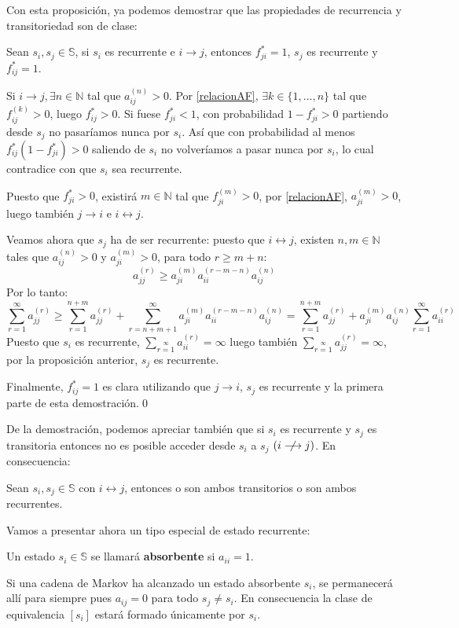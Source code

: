Con esta proposición, ya podemos demostrar que las propiedades de recurrencia y transitoriedad son de clase:
\begin{theorem}\label{relacionEstadosRecurrentes}
    Sean $s_i, s_j\in\mathbb{S}$, si $s_i$ es recurrente e $i\longrightarrow j$, entonces $f_{ji}^*=1$, $s_j$ es recurrente y $f_{ij}^*=1$.
\end{theorem}
\begin{proofs*}
Si $i\longrightarrow j, \exists n\in\mathbb{N}$ tal que $a_{ij}^{(n)}>0$. Por \ref{relacionAF}, $\exists k\in\{1,\dots ,n\}$ tal que $f_{ij}^{(k)}>0$, luego $f_{ij}^*>0$. Si fuese $f_{ji}^*<1$, con probabilidad $1-f_{ji}^*>0$ partiendo desde $s_j$ no pasaríamos nunca por $s_i$. Así que con probabilidad al menos $f_{ij}^*(1-f_{ji}^*)>0$ saliendo de $s_i$ no volveríamos a pasar nunca por $s_i$, lo cual contradice con que $s_i$ sea recurrente.

Puesto que $f_{ji}^*>0$, existirá $m\in\mathbb{N}$ tal que $f_{ji}^{(m)}>0$, por \ref{relacionAF}, $a_{ji}^{(m)}>0$, luego también $j\longrightarrow i$ e $i\longleftrightarrow j$.

Veamos ahora que $s_j$ ha de ser recurrente: puesto que $i\longleftrightarrow j$, existen $n,m \in\mathbb{N}$ tales que $a_{ij}^{(n)}>0$ y $a_{ji}^{(m)}>0$, para todo $r\geq m+n$:
\[a_{jj}^{(r)}\geq a_{ji}^{(m)}a_{ii}^{(r-m-n)}a_{ij}^{(n)}\]
Por lo tanto:
\[\sum_{r=1}^\infty a_{jj}^{(r)}\geq\sum_{r=1}^{n+m} a_{jj}^{(r)}+\sum_{r=n+m+1}^\infty a_{ji}^{(m)}a_{ii}^{(r-m-n)}a_{ij}^{(n)}=\sum_{r=1}^{n+m} a_{jj}^{(r)}+a_{ji}^{(m)}a_{ij}^{(n)}\sum_{r=1}^{\infty} a_{ii}^{(r)}\]
Puesto que $s_i$ es recurrente, $\sum\limits_{r=1}\limits^{\infty} a_{ii}^{(r)}=\infty$ luego también $\sum\limits_{r=1}\limits^{\infty} a_{jj}^{(r)}=\infty$, por la proposición anterior, $s_j$ es recurrente.

Finalmente, $f_{ij}^*=1$ es clara utilizando que $j\longrightarrow i$, $s_j$ es recurrente y la primera parte de esta demostración.\qed
\end{proofs*}

De la demostración, podemos apreciar también que si $s_i$ es recurrente y $s_j$ es transitoria entonces no es posible acceder desde $s_i$ a $s_j$  $(i\centernot\longrightarrow j)$. En consecuencia:

\begin{corollary}
    Sean $s_i, s_j\in\mathbb{S}$ con $i\longleftrightarrow j$, entonces o son ambos transitorios o son ambos recurrentes.
\end{corollary}
Vamos a presentar ahora un tipo especial de estado recurrente:
\begin{definition}
Un estado $s_i\in\mathbb{S}$ se llamará \textbf{absorbente} si $a_{ii}=1$.
\end{definition}
Si una cadena de Markov ha alcanzado un estado absorbente $s_i$, se permanecerá allí para siempre pues $a_{ij}=0$ para todo $s_j\neq s_i$. En consecuencia la clase de equivalencia $[s_i]$ estará formado únicamente por $s_i$.

